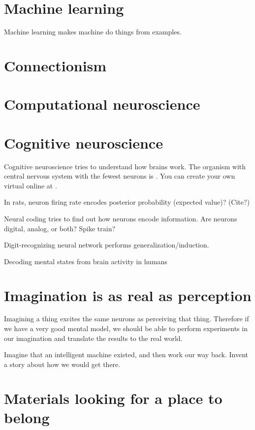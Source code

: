 \section{Machine learning}

Machine learning makes machine do things from examples.

\section{Connectionism}

\section{Computational neuroscience}

\section{Cognitive neuroscience}

Cognitive neuroscience tries to understand how brains work.
The organism with central nervous system with the fewest neurons is .
You can create your own virtual  online at \cite{openworm}.

In rats, neuron firing rate encodes posterior probability (expected value)?
(Cite?)

Neural coding tries to find out how neurons encode information.
Are neurons digital, analog, or both?
Spike train?

Digit-recognizing neural network performs generalization/induction.

Decoding mental states from brain activity in humans \cite{haynes2006decoding}

\section{Imagination is as real as perception}

Imagining a thing excites the same neurons as perceiving that thing.
Therefore if we have a very good mental model,
we should be able to perform experiments in our imagination
and translate the results to the real world.

Imagine that an intelligent machine existed,
and then work our way back.
Invent a story about how we would get there.

\section{Materials looking for a place to belong}


